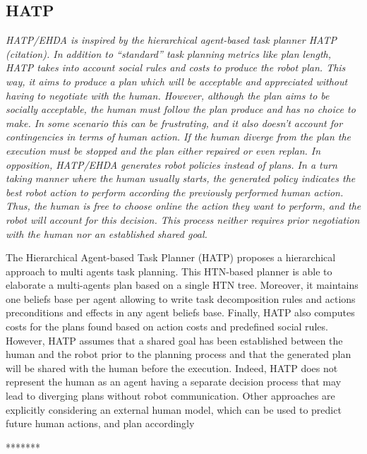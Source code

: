 \subsection{HATP}
\textit{HATP/EHDA is inspired by the hierarchical agent-based task planner HATP (citation). In addition to ``standard'' task planning metrics like plan length, HATP takes into account social rules and costs to produce the robot plan. This way, it aims to produce a plan which will be acceptable and appreciated without having to negotiate with the human. However, although the plan aims to be socially acceptable, the human must follow the plan produce and has no choice to make. 
In some scenario this can be frustrating, and it also doesn't account for contingencies in terms of human action. If the human diverge from the plan the execution must be stopped and the plan either repaired or even replan. 
In opposition, HATP/EHDA generates robot policies instead of plans. In a turn taking manner where the human usually starts, the generated policy indicates the best robot action to perform according the previously performed human action. Thus, the human is free to choose online the action they want to perform, and the robot will account for this decision. This process neither requires prior negotiation with the human nor an established shared goal.}


The Hierarchical Agent-based Task Planner (HATP) proposes a hierarchical approach to multi agents task planning. This HTN-based planner is able to elaborate a multi-agents plan based on a single HTN tree. Moreover, it maintains one beliefs base per agent allowing to write task decomposition rules and actions preconditions and effects in any agent beliefs base. Finally, HATP also computes costs for the plans found based on action costs and predefined social rules. However, HATP assumes that a shared goal has been established between the human and the robot prior to the planning process and that the generated plan will be shared with the human before the execution. Indeed, HATP does not represent the human as an agent having a separate decision process that may lead to diverging plans without robot communication. Other approaches are explicitly considering an external human model, which can be used to predict future human actions, and plan accordingly

*******

